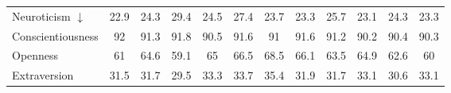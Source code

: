 \begin{table}[ht]
\begin{tabular}{l|ccccc|ccccc|c}
Neuroticism $\downarrow$ & \cellcolor{royalblue!6} 22.9 & \cellcolor{myred!15} 24.3 & \cellcolor{myred!90} 29.4 & \cellcolor{myred!18} 24.5 & \cellcolor{myred!60} 27.4 & \cellcolor{myred!6} 23.7 & 23.3 & \cellcolor{myred!35} 25.7 & \cellcolor{royalblue!3} 23.1 & \cellcolor{myred!15} 24.3 & 23.3 \\
Conscientiousness & \cellcolor{royalblue!90} 92 & \cellcolor{royalblue!53} 91.3 & \cellcolor{royalblue!79} 91.8 & \cellcolor{royalblue!11} 90.5 & \cellcolor{royalblue!69} 91.6 & \cellcolor{royalblue!37} 91 & \cellcolor{royalblue!69} 91.6 & \cellcolor{royalblue!48} 91.2 & \cellcolor{myred!5} 90.2 & \cellcolor{royalblue!5} 90.4 & 90.3 \\
Openness & \cellcolor{royalblue!11} 61 & \cellcolor{royalblue!49} 64.6 & \cellcolor{myred!10} 59.1 & \cellcolor{royalblue!53} 65 & \cellcolor{royalblue!69} 66.5 & \cellcolor{royalblue!90} 68.5 & \cellcolor{royalblue!65} 66.1 & \cellcolor{royalblue!37} 63.5 & \cellcolor{royalblue!52} 64.9 & \cellcolor{royalblue!28} 62.6 & 60 \\
Extraversion & \cellcolor{myred!40} 31.5 & \cellcolor{myred!35} 31.7 & \cellcolor{myred!90} 29.5 & \cellcolor{royalblue!5} 33.3 & \cellcolor{royalblue!15} 33.7 & \cellcolor{royalblue!57} 35.4 & \cellcolor{myred!30} 31.9 & \cellcolor{myred!35} 31.7 & 33.1 & \cellcolor{myred!62} 30.6 & 33.1 \\
\bottomrule
\end{tabular}
\end{table}